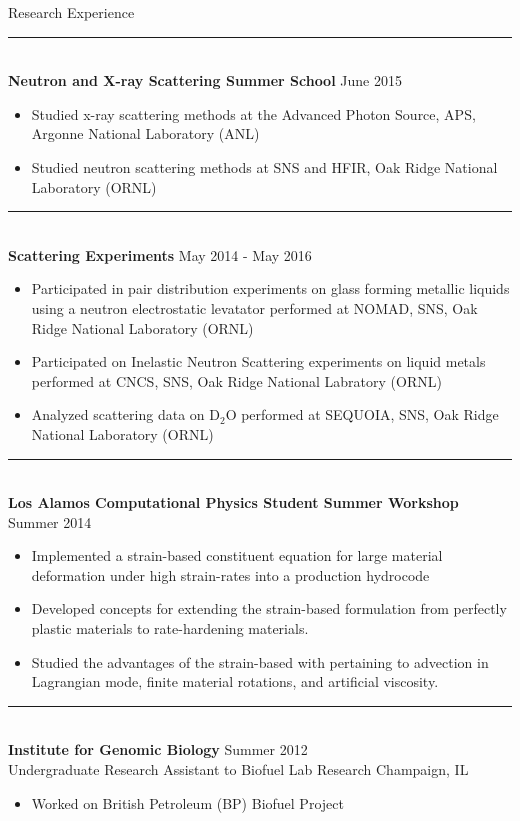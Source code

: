 \documentclass[10pt]{resume} %
\begin{document}
\begin{rSection}{Research Experience}
\begin{itemize}
	\end{itemize}
	{\centering\noindent\rule{5cm}{0.4pt}}
	\\
	{\bf Neutron and X-ray Scattering Summer School} \hfill {June 2015}
	\begin{itemize}
	\item Studied x-ray scattering methods at the Advanced Photon Source, APS, Argonne National Laboratory (ANL)
	\item Studied neutron scattering methods at SNS and HFIR, Oak Ridge National Laboratory (ORNL)
	\end{itemize}
	{\centering\noindent\rule{5cm}{0.4pt}}
	\\
	{\bf Scattering Experiments} \hfill {May 2014 - May 2016}
	\begin{itemize}
	\item Participated in pair distribution experiments on glass forming metallic liquids using a neutron electrostatic levatator performed at NOMAD, SNS, Oak Ridge National Laboratory (ORNL)
	\item Participated on Inelastic Neutron Scattering experiments on liquid metals performed at CNCS, SNS, Oak Ridge National Labratory (ORNL) 
	\item Analyzed scattering data on D$_2$O performed at SEQUOIA, SNS, Oak Ridge National Laboratory (ORNL)
	\end{itemize}
	{\centering\noindent\rule{5cm}{0.4pt}}
	\\
	{\bf Los Alamos Computational Physics Student Summer Workshop} \hfill {Summer 2014}
	\begin{itemize}
	\item Implemented a strain-based constituent equation for large material deformation under high strain-rates into a production hydrocode
	\item Developed concepts for extending the strain-based formulation from perfectly plastic materials to rate-hardening materials.
	\item Studied the advantages of the strain-based with pertaining to advection in Lagrangian mode, finite material rotations, and artificial viscosity.
	\end{itemize}
	{\centering\noindent\rule{5cm}{0.4pt}}
	\\
	{\bf Institute for Genomic Biology} \hfill {Summer 2012}\\
	Undergraduate Research Assistant to Biofuel Lab Research \hfill {Champaign, IL}
	\begin{itemize}
	\item Worked on British Petroleum (BP) Biofuel Project

\end{itemize}
\end{rSection}
\end{document}
